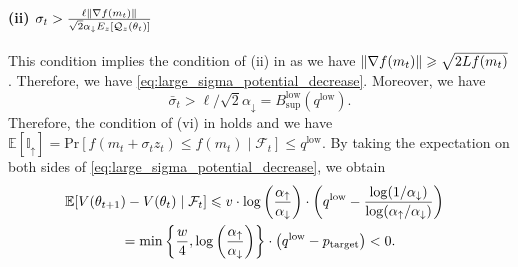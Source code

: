 \documentclass[journal]{IEEEtran}
\providecommand{\E}{\mathbb{E}} %
\renewcommand{\geq}{\geqslant} %
\renewcommand{\leq}{\leqslant} %
\DeclarePairedDelimiter{\norm}{\lVert}{\rVert}
\theoremstyle{definition}
\newcommand{\indup}{\mathbb{I}_{\uparrow}}
\newcommand{\aup}{\alpha_{\uparrow}}
\newcommand{\adown}{\alpha_{\downarrow}}
\begin{document}
\paragraph*{(ii) $\sigma_t > \frac{\ell \norm{\nabla f(m_t)}}{\sqrt{2}\adown  E_z[\mathcal{Q}_z(\theta_t)]}$}
This condition implies the condition of (ii) in  as we have $\norm{\nabla f(m_t)} \geq \sqrt{2 L f(m_t)}$. 
Therefore, we have \eqref{eq:large_sigma_potential_decrease}. 
Moreover, we have
\begin{equation}
\bar\sigma_t > \ell / \sqrt{2}\adown
= B_{\sup}^\mathrm{low}(q^\mathrm{low}).
\end{equation}
Therefore, the condition of (vi) in  holds and we have
$\E[\indup] = \mathrm{Pr}\left[f(m_t + \sigma_t z_t)\leq f(m_t) \mid \mathcal{F}_t\right] \leq q^\mathrm{low}$.
By taking the expectation on both sides of \eqref{eq:large_sigma_potential_decrease}, we obtain
\begin{multline}
\hspace{-0.8em}
\E[ V(\theta_{t+1}) - V(\theta_t) \mid \mathcal{F}_t ]
\leq v\cdot\log\left(\frac{\aup}{\adown}\right)\cdot \left( q^\mathrm{low} - \frac{\log(1/\adown)}{\log(\aup/\adown)}\right)
\\
= 
\min\left\{ \frac{w}{4} , \log\left(\frac{\aup}{\adown}\right)\right\}
\cdot \left( q^\mathrm{low} - p_\mathrm{target}\right)
<0
\label{eq:large_expected_potential_decrease}
  .
\end{multline}
\end{document}
